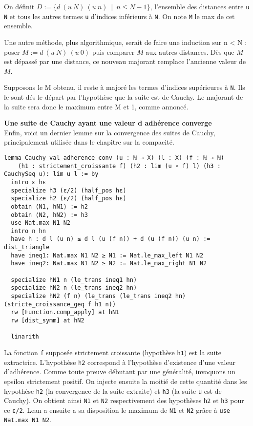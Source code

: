 \documentclass[a4paper, 12pt]{article}
\newcommand{\lean}[1]{\texttt{#1}}
\begin{document}
On définit $D := \{d\ (u\ N)\ (u\ n)\ \mid\ n \leq N-1\}$, l'ensemble des distances entre \lean{u N} et tous les autres termes \lean{u} d'indices inférieurs à \lean{N}. On note \lean{M} le max de cet ensemble.

Une autre méthode, plus algorithmique, serait de faire une induction sur n < N : poser $M := d\ (u\ N)\ (u\ 0)$ puis comparer $M$ aux autres distances. Dès que $M$ est dépassé par une distance, ce nouveau majorant remplace l'ancienne valeur de $M$.

Supposons le M obtenu, il reste à majoré les termes d'indices supérieures à \lean{N}. Ils le sont dés le départ par l'hypothèse que la suite est de Cauchy. Le majorant de la suite sera donc le maximum entre M et 1, comme annoncé.


\textbf{Une suite de Cauchy ayant une valeur d adhérence converge}\\

Enfin, voici un dernier lemme sur la convergence des suites de Cauchy, principalement utilisée dans le chapitre sur la compacité.

\begin{verbatim}
lemma Cauchy_val_adherence_conv (u : ℕ → X) (l : X) (f : ℕ → ℕ)
    (h1 : strictement_croissante f) (h2 : lim (u ∘ f) l) (h3 : CauchySeq u): lim u l := by
  intro ε hε
  specialize h3 (ε/2) (half_pos hε)
  specialize h2 (ε/2) (half_pos hε)
  obtain ⟨N1, hN1⟩ := h2
  obtain ⟨N2, hN2⟩ := h3
  use Nat.max N1 N2
  intro n hn
  have h : d l (u n) ≤ d l (u (f n)) + d (u (f n)) (u n) := dist_triangle
  have ineq1: Nat.max N1 N2 ≥ N1 := Nat.le_max_left N1 N2
  have ineq2: Nat.max N1 N2 ≥ N2 := Nat.le_max_right N1 N2

  specialize hN1 n (le_trans ineq1 hn)
  specialize hN2 n (le_trans ineq2 hn)
  specialize hN2 (f n) (le_trans (le_trans ineq2 hn) (stricte_croissance_geq f h1 n))
  rw [Function.comp_apply] at hN1
  rw [dist_symm] at hN2

  linarith
\end{verbatim}

La fonction \lean{f} supposée strictement croissante (hypothèse \lean{h1}) est la suite extractrice. L'hypothèse \lean{h2} correspond à l'hypothèse d'existence d'une valeur d'adhérence. Comme toute preuve débutant par une généralité, invoquons un epsilon strictement positif. On injecte ensuite la moitié de cette quantité dans les hypothèse \lean{h2} (la convergence de la suite extraite) et \lean{h3} (la suite \lean{u} est de Cauchy).
On obtient ainsi \lean{N1} et \lean{N2} respectivement des hypothèses \lean{h2} et \lean{h3} pour ce \lean{ε/2}. Lean a ensuite a sa disposition le maximum de \lean{N1} et \lean{N2} grâce à \lean{use Nat.max N1 N2}.
\end{document}
